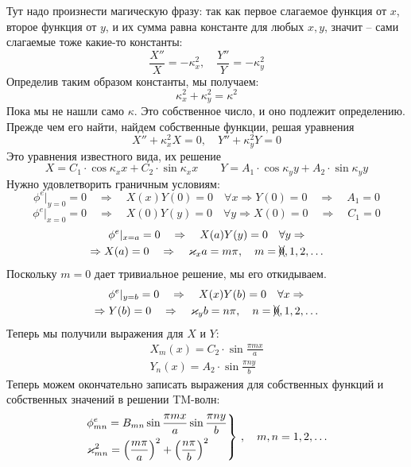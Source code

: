 Тут надо произнести магическую фразу: так как первое слагаемое функция от $x$, второе функция от $y$, и их сумма равна константе для любых $x,y$, значит -- сами слагаемые тоже какие-то константы:
\begin{equation}
	\frac{X''}{X}=-\kappa_x^2, \quad
	\frac{Y''}{Y}=-\kappa_y^2
\end{equation}
Определив таким образом константы, мы получаем:
\begin{equation}
	\kappa_x^2+ \kappa_y^2=\kappa^2
\end{equation}
Пока мы не нашли само $\kappa$. Это собственное число, и оно подлежит определению. Прежде чем его найти, найдем собственные функции, решая уравнения
\begin{equation}
	X''+\kappa_x^2X=0, \quad Y''+\kappa_y^2Y=0
\end{equation}	
Это уравнения известного вида, их решение
\begin{equation}
	X=C_1\cdot\cos{\kappa_x x}+
		C_2\cdot\sin{\kappa_x x}
	\qquad
	Y=A_1\cdot\cos{\kappa_y y}+
		A_2\cdot\sin{\kappa_y y}	
\end{equation}
Нужно удовлетворить граничным условиям: 
\begin{equation}
	\phi^e|_{y=0}=0 \quad \Rightarrow \quad
		X(x)Y(0)=0 \quad \forall x \Rightarrow
		Y(0)=0 \quad \Rightarrow \quad A_1=0
\end{equation}
\begin{equation}
	\phi^e|_{x=0}=0 \quad \Rightarrow \quad
		X(0)Y(y)=0 \quad \forall y \Rightarrow
		X(0)=0 \quad \Rightarrow \quad C_1=0
\end{equation}
\begin{gather}
	\phi^e|_{x=a}=0 \quad \Rightarrow \quad
		X(a)Y(y)=0 \quad \forall y  \Rightarrow  \\ \Rightarrow
		X(a)=0 \quad \Rightarrow \quad \kappa_x a = m\pi, \quad m=\xcancel{0},1,2,\ldots
\end{gather}
Поскольку $m=0$ дает тривиальное решение, мы его откидываем.
\begin{gather}
	\phi^e|_{y=b}=0 \quad \Rightarrow \quad
		X(x)Y(b)=0 \quad \forall x  \Rightarrow  \\ \Rightarrow
		Y(b)=0 \quad \Rightarrow \quad \kappa_y b = n\pi , \quad n=\xcancel{0},1,2,\ldots
\end{gather}
Теперь мы получили выражения для $X$ и $Y$:
\begin{gather}
	X_m(x)=C_2\cdot\sin\frac{\pi m x}{a}\\
	Y_n(x)=A_2\cdot\sin\frac{\pi n y}{b}
\end{gather}
Теперь можем окончательно записать выражения для собственных функций и собственных значений в решении TM-волн:
\begin{gather}
	\label{phi_tm}
	\left.\begin{aligned}
		&\phi^e_{mn}=B_{mn}\sin\frac{\pi m x}{a}\sin\frac{\pi n y}{b}\\
		&\kappa_{mn}^2=\qty(\frac{m\pi}{a})^2+\qty(\frac{n\pi}{b})^2	
	\end{aligned}\right\}\,, \quad m,n=1,2,\ldots
\end{gather}
